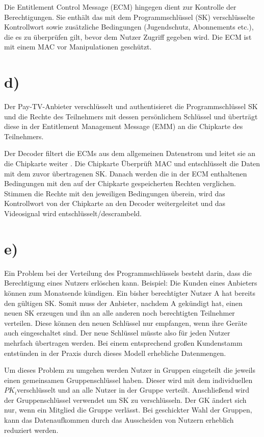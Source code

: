 \documentclass[12pt.twoside,a4paper,notitlepage,parskip]{scrartcl}
\begin{document}
Die Entitlement Control Message (ECM) hingegen dient zur Kontrolle der Berechtigungen. Sie enthält das mit dem Programmschlüssel (SK) verschlüsselte Kontrollwort sowie zusätzliche Bedingungen (Jugendschutz, Abonnements etc.), die es zu überprüfen gilt, bevor dem Nutzer Zugriff gegeben wird. Die ECM ist mit einem MAC vor Manipulationen geschützt. 

\section*{d)}
Der Pay-TV-Anbieter verschlüsselt und authentisieret die Programmschlüssel SK und die Rechte des Teilnehmers mit dessen persönlichem Schlüssel  und überträgt diese in der Entitlement Management Message (EMM) an die Chipkarte des Teilnehmers.

Der Decoder filtert die ECMs aus dem allgemeinen Datenstrom  und leitet sie an die Chipkarte weiter . Die Chipkarte Überprüft MAC  und entschlüsselt die Daten mit dem zuvor übertragenen SK. Danach werden die in der ECM enthaltenen Bedingungen mit den auf der Chipkarte gespeicherten Rechten verglichen. Stimmen  die Rechte mit den jeweiligen Bedingungen überein, wird das Kontrollwort von der Chipkarte an den Decoder weitergeleitet und das Videosignal wird entschlüsselt/descrambeld.

\section*{e)}
Ein Problem bei der Verteilung des Programmschlüssels besteht darin, dass die Berechtigung eines Nutzers erlöschen kann. Beispiel: Die Kunden eines Anbieters können zum Monatsende kündigen. Ein bisher berechtigter Nutzer A hat bereits den gültigen SK. Somit muss der Anbieter, nachdem A gekündigt hat, einen neuen SK erzeugen und ihn an alle anderen noch berechtigten Teilnehmer verteilen. Diese können den neuen Schlüssel nur empfangen, wenn ihre Geräte auch eingeschaltet sind. Der neue Schlüssel müsste also für jeden Nutzer mehrfach übertragen werden. Bei einem entsprechend großen Kundenstamm entstünden in der Praxis durch dieses Modell erhebliche Datenmengen. 

Um dieses Problem zu umgehen werden Nutzer in Gruppen eingeteilt die jeweils einen gemeinsamen Gruppenschlüssel haben. Dieser wird mit dem individuellen $PK_{i} $verschlüsselt und an alle Nutzer in der Gruppe verteilt. Anschließend wird der Gruppenschlüssel verwendet um SK zu verschlüsseln. Der GK ändert sich nur, wenn ein Mitglied die Gruppe verlässt. Bei geschickter Wahl der Gruppen, kann das Datenaufkommen durch das Ausscheiden von Nutzern erheblich reduziert werden.
\end{document}
